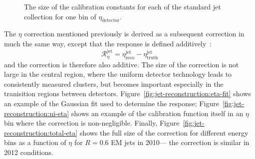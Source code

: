

\begin{figure}
\centering
{}
\caption{The size of the calibration constants for each of the standard jet collection for one bin of $\eta_\mathrm{detector}$.}
\label{fig:jet-reconstruction:total_jes}
\end{figure}


The $\eta$ correction mentioned previously is derived as a subsequent correction in much the same way, except that the response is defined additively~\cite{JES2010}:
%
\begin{equation}
\mathcal{R}_\eta^\mathrm{jet} = \eta^{\mathrm{jet}}_{\mathrm{reco}} -  \eta^{\mathrm{jet}}_{\mathrm{truth}} 
\end{equation}
%
and the correction is therefore also additive. The size of the correction is not large in the central region, where the uniform detector technology leads to consistently measured clusters, but becomes important especially in the tranisition regions between detectors. Figure~\ref{fig:jet-reconstruction:eta-fit} shows an example of the Gaussian fit used to determine the response; Figure~\ref{fig:jet-reconstruction:ni-eta} shows an example of the calibration function itself in an $\eta$ bin where the correction is non-negligible. Finally, Figure~\ref{fig:jet-reconstruction:total-eta} shows the full size of the correction for different energy bins as a function of $\eta$ for $R=0.6$ EM jets in 2010--- the correction is similar in 2012 conditions.

